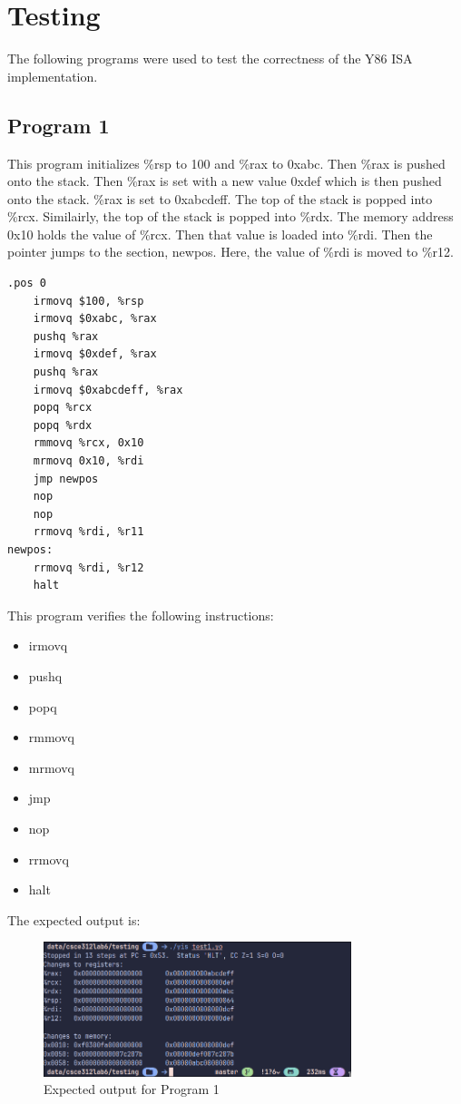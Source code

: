 \documentclass{article}
\begin{document}
\newpage

\section{Testing}

The following programs were used to test the correctness of the Y86 ISA implementation.

\subsection{Program 1}

This program initializes \%rsp to 100 and \%rax to 0xabc. 
Then \%rax is pushed onto the stack. 
Then \%rax is set with a new value 0xdef which is then pushed onto the stack. 
\%rax is set to 0xabcdeff. The top of the stack is popped into \%rcx. 
Similairly, the top of the stack is popped into \%rdx. 
The memory address 0x10 holds the value of \%rcx. 
Then that value is loaded into \%rdi. 
Then the pointer jumps to the section, newpos. 
Here, the value of \%rdi is moved to \%r12. 

\begin{lstlisting}[language=myassembly]
    .pos 0
    irmovq $100, %rsp
    irmovq $0xabc, %rax
    pushq %rax
    irmovq $0xdef, %rax
    pushq %rax
    irmovq $0xabcdeff, %rax
    popq %rcx
    popq %rdx
    rmmovq %rcx, 0x10
    mrmovq 0x10, %rdi
    jmp newpos
    nop
    nop
    rrmovq %rdi, %r11
newpos:
    rrmovq %rdi, %r12
    halt
\end{lstlisting}

This program verifies the following instructions:
\begin{itemize}
    \item irmovq
    \item pushq
    \item popq
    \item rmmovq
    \item mrmovq
    \item jmp
    \item nop
    \item rrmovq
    \item halt
\end{itemize}

The expected output is:

\begin{figure}[H]
    \centering
    \includegraphics[width=0.8\textwidth]{./images/test1_out.png}
    \caption{Expected output for Program 1}
\end{figure}
\end{document}
